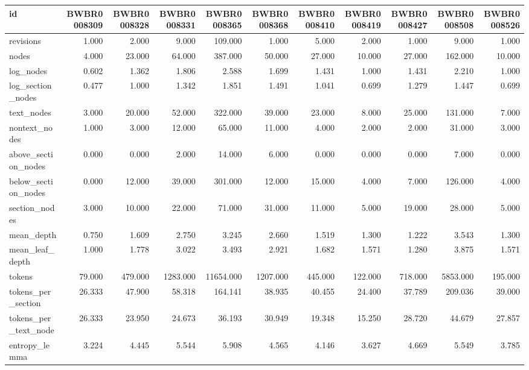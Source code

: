 \begin{tabular}{lrrrrrrrrrr}
\toprule
id & BWBR0008309 & BWBR0008328 & BWBR0008331 & BWBR0008365 & BWBR0008368 & BWBR0008410 & BWBR0008419 & BWBR0008427 & BWBR0008508 & BWBR0008526 \\
\midrule
revisions & 1.000 & 2.000 & 9.000 & 109.000 & 1.000 & 5.000 & 2.000 & 1.000 & 9.000 & 1.000 \\
\cline{1-11}
nodes & 4.000 & 23.000 & 64.000 & 387.000 & 50.000 & 27.000 & 10.000 & 27.000 & 162.000 & 10.000 \\
\cline{1-11}
log\_nodes & 0.602 & 1.362 & 1.806 & 2.588 & 1.699 & 1.431 & 1.000 & 1.431 & 2.210 & 1.000 \\
\cline{1-11}
log\_section\_nodes & 0.477 & 1.000 & 1.342 & 1.851 & 1.491 & 1.041 & 0.699 & 1.279 & 1.447 & 0.699 \\
\cline{1-11}
text\_nodes & 3.000 & 20.000 & 52.000 & 322.000 & 39.000 & 23.000 & 8.000 & 25.000 & 131.000 & 7.000 \\
\cline{1-11}
nontext\_nodes & 1.000 & 3.000 & 12.000 & 65.000 & 11.000 & 4.000 & 2.000 & 2.000 & 31.000 & 3.000 \\
\cline{1-11}
above\_section\_nodes & 0.000 & 0.000 & 2.000 & 14.000 & 6.000 & 0.000 & 0.000 & 0.000 & 7.000 & 0.000 \\
\cline{1-11}
below\_section\_nodes & 0.000 & 12.000 & 39.000 & 301.000 & 12.000 & 15.000 & 4.000 & 7.000 & 126.000 & 4.000 \\
\cline{1-11}
section\_nodes & 3.000 & 10.000 & 22.000 & 71.000 & 31.000 & 11.000 & 5.000 & 19.000 & 28.000 & 5.000 \\
\cline{1-11}
mean\_depth & 0.750 & 1.609 & 2.750 & 3.245 & 2.660 & 1.519 & 1.300 & 1.222 & 3.543 & 1.300 \\
\cline{1-11}
mean\_leaf\_depth & 1.000 & 1.778 & 3.022 & 3.493 & 2.921 & 1.682 & 1.571 & 1.280 & 3.875 & 1.571 \\
\cline{1-11}
tokens & 79.000 & 479.000 & 1283.000 & 11654.000 & 1207.000 & 445.000 & 122.000 & 718.000 & 5853.000 & 195.000 \\
\cline{1-11}
tokens\_per\_section & 26.333 & 47.900 & 58.318 & 164.141 & 38.935 & 40.455 & 24.400 & 37.789 & 209.036 & 39.000 \\
\cline{1-11}
tokens\_per\_text\_node & 26.333 & 23.950 & 24.673 & 36.193 & 30.949 & 19.348 & 15.250 & 28.720 & 44.679 & 27.857 \\
\cline{1-11}
entropy\_lemma & 3.224 & 4.445 & 5.544 & 5.908 & 4.565 & 4.146 & 3.627 & 4.669 & 5.549 & 3.785 \\

\end{tabular}
